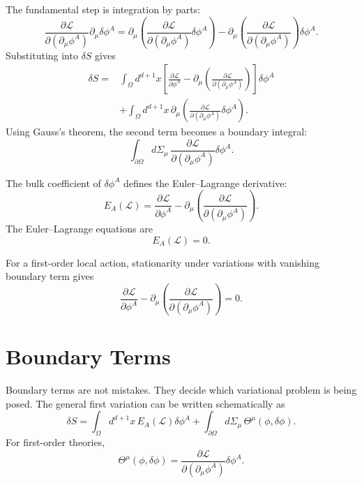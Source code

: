 The fundamental step is integration by parts:
\[
    \frac{\partial\mathcal{L}}{\partial(\partial_\mu\phi^A)}
    \partial_\mu\delta\phi^A
    =\partial_\mu\left(
        \frac{\partial\mathcal{L}}{\partial(\partial_\mu\phi^A)}
        \delta\phi^A
    \right)
    -\partial_\mu\left(
        \frac{\partial\mathcal{L}}{\partial(\partial_\mu\phi^A)}
    \right)\delta\phi^A.
\]
Substituting into \(\delta S\) gives
\[
\begin{aligned}
    \delta S
    ={}&\int_\Omega d^{d+1}x\left[
        \frac{\partial\mathcal{L}}{\partial\phi^A}
        -\partial_\mu\left(
            \frac{\partial\mathcal{L}}{\partial(\partial_\mu\phi^A)}
        \right)
    \right]\delta\phi^A \\
    &+\int_\Omega d^{d+1}x\,\partial_\mu\left(
        \frac{\partial\mathcal{L}}{\partial(\partial_\mu\phi^A)}
        \delta\phi^A
    \right).
\end{aligned}
\]
Using Gauss's theorem, the second term becomes a boundary integral:
\[
    \int_{\partial\Omega} d\Sigma_\mu\,
    \frac{\partial\mathcal{L}}{\partial(\partial_\mu\phi^A)}
    \delta\phi^A.
\]

The bulk coefficient of \(\delta\phi^A\) defines the Euler--Lagrange derivative:
\[
    E_A(\mathcal{L})
    =\frac{\partial\mathcal{L}}{\partial\phi^A}
     -\partial_\mu\left(
        \frac{\partial\mathcal{L}}{\partial(\partial_\mu\phi^A)}
     \right).
\]
The Euler--Lagrange equations are
\[
    E_A(\mathcal{L})=0.
\]

\begin{theorembox}
For a first-order local action, stationarity under variations with vanishing
boundary term gives
\[
    \frac{\partial\mathcal{L}}{\partial\phi^A}
    -\partial_\mu\left(
        \frac{\partial\mathcal{L}}{\partial(\partial_\mu\phi^A)}
    \right)=0.
\]
\end{theorembox}

\section{Boundary Terms}

Boundary terms are not mistakes. They decide which variational problem is being
posed. The general first variation can be written schematically as
\[
    \delta S=\int_\Omega d^{d+1}x\,E_A(\mathcal{L})\delta\phi^A
    +\int_{\partial\Omega}d\Sigma_\mu\,\Theta^\mu(\phi,\delta\phi).
\]
For first-order theories,
\[
    \Theta^\mu(\phi,\delta\phi)
    =\frac{\partial\mathcal{L}}{\partial(\partial_\mu\phi^A)}\delta\phi^A.
\]

